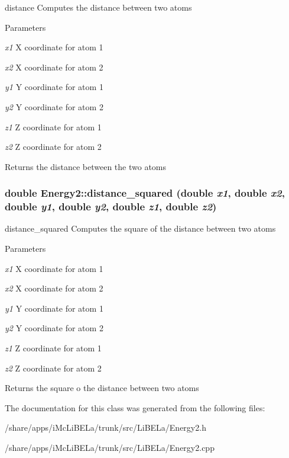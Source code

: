 distance Computes the distance between two atoms 
\begin{DoxyParams}{Parameters}
\item[{\em x1}]X coordinate for atom 1 \item[{\em x2}]X coordinate for atom 2 \item[{\em y1}]Y coordinate for atom 1 \item[{\em y2}]Y coordinate for atom 2 \item[{\em z1}]Z coordinate for atom 1 \item[{\em z2}]Z coordinate for atom 2 \end{DoxyParams}
\begin{DoxyReturn}{Returns}
the distance between the two atoms 
\end{DoxyReturn}
\hypertarget{classEnergy2_a1711c52d5df4cd462fe5a5bd34c56e46}{
\subsubsection[{distance\_\-squared}]{\setlength{\rightskip}{0pt plus 5cm}double Energy2::distance\_\-squared (double {\em x1}, \/  double {\em x2}, \/  double {\em y1}, \/  double {\em y2}, \/  double {\em z1}, \/  double {\em z2})}}
\label{classEnergy2_a1711c52d5df4cd462fe5a5bd34c56e46}


distance\_\-squared Computes the square of the distance between two atoms 
\begin{DoxyParams}{Parameters}
\item[{\em x1}]X coordinate for atom 1 \item[{\em x2}]X coordinate for atom 2 \item[{\em y1}]Y coordinate for atom 1 \item[{\em y2}]Y coordinate for atom 2 \item[{\em z1}]Z coordinate for atom 1 \item[{\em z2}]Z coordinate for atom 2 \end{DoxyParams}
\begin{DoxyReturn}{Returns}
the square o the distance between two atoms 
\end{DoxyReturn}


The documentation for this class was generated from the following files:\begin{DoxyCompactItemize}
\item 
/share/apps/iMcLiBELa/trunk/src/LiBELa/Energy2.h\item 
/share/apps/iMcLiBELa/trunk/src/LiBELa/Energy2.cpp\end{DoxyCompactItemize}
